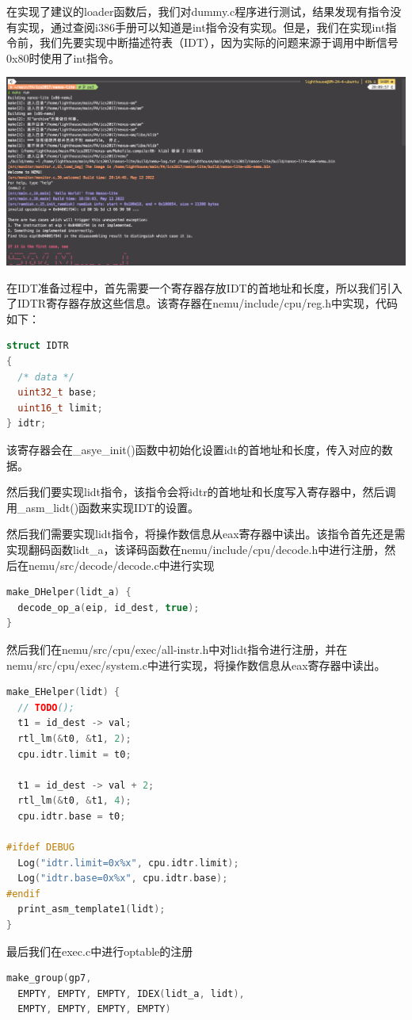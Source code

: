 \documentclass[UTF8,a4paper,10pt]{ctexart}
\begin{document}
在实现了建议的loader函数后，我们对dummy.c程序进行测试，结果发现有指令没有实现，通过查阅i386手册可以知道是int指令没有实现。但是，我们在实现int指令前，我们先要实现中断描述符表（IDT），因为实际的问题来源于调用中断信号0x80时使用了int指令。

\begin{center}
  \includegraphics*[scale = 0.3]{pic/1}
\end{center}

在IDT准备过程中，首先需要一个寄存器存放IDT的首地址和长度，所以我们引入了IDTR寄存器存放这些信息。该寄存器在nemu/include/cpu/reg.h中实现，代码如下：  
\begin{lstlisting}[language = C++]
struct IDTR
{
  /* data */
  uint32_t base;
  uint16_t limit; 
} idtr;
\end{lstlisting}

该寄存器会在\_asye\_init()函数中初始化设置idt的首地址和长度，传入对应的数据。

然后我们要实现lidt指令，该指令会将idtr的首地址和长度写入寄存器中，然后调用\_asm\_lidt()函数来实现IDT的设置。

然后我们需要实现lidt指令，将操作数信息从eax寄存器中读出。该指令首先还是需实现翻码函数lidt\_a，该译码函数在nemu/include/cpu/decode.h中进行注册，然后在nemu/src/decode/decode.c中进行实现
\begin{lstlisting}[language = C++]
make_DHelper(lidt_a) {
  decode_op_a(eip, id_dest, true);
}
\end{lstlisting}

然后我们在nemu/src/cpu/exec/all-instr.h中对lidt指令进行注册，并在nemu/src/cpu/exec/system.c中进行实现，将操作数信息从eax寄存器中读出。
\begin{lstlisting}[language = C++]
make_EHelper(lidt) {
  // TODO();
  t1 = id_dest -> val;
  rtl_lm(&t0, &t1, 2);
  cpu.idtr.limit = t0;

  t1 = id_dest -> val + 2;
  rtl_lm(&t0, &t1, 4);
  cpu.idtr.base = t0;

#ifdef DEBUG
  Log("idtr.limit=0x%x", cpu.idtr.limit);
  Log("idtr.base=0x%x", cpu.idtr.base);
#endif
  print_asm_template1(lidt);
}
\end{lstlisting}
最后我们在exec.c中进行optable的注册
\begin{lstlisting}[language = C++]
make_group(gp7,
  EMPTY, EMPTY, EMPTY, IDEX(lidt_a, lidt),
  EMPTY, EMPTY, EMPTY, EMPTY)
\end{lstlisting}
\end{document}
